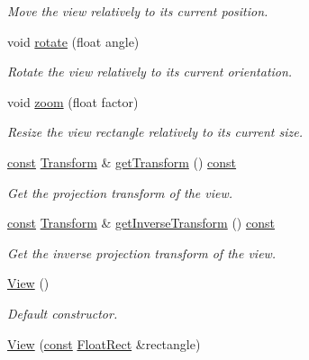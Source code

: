 \begin{DoxyCompactItemize}
\begin{DoxyCompactList}\small\item\em Move the view relatively to its current position. \end{DoxyCompactList}\item 
void \hyperlink{classsf_1_1_view_a5fd3901aae1845586ca40add94faa378}{rotate} (float angle)
\begin{DoxyCompactList}\small\item\em Rotate the view relatively to its current orientation. \end{DoxyCompactList}\item 
void \hyperlink{classsf_1_1_view_a4a72a360a5792fbe4e99cd6feaf7726e}{zoom} (float factor)
\begin{DoxyCompactList}\small\item\em Resize the view rectangle relatively to its current size. \end{DoxyCompactList}\item 
\hyperlink{term__entry_8h_a57bd63ce7f9a353488880e3de6692d5a}{const} \hyperlink{classsf_1_1_transform}{Transform} \& \hyperlink{classsf_1_1_view_a0109dba48aee769126f670a212b3ed7f}{get\-Transform} () \hyperlink{term__entry_8h_a57bd63ce7f9a353488880e3de6692d5a}{const} 
\begin{DoxyCompactList}\small\item\em Get the projection transform of the view. \end{DoxyCompactList}\item 
\hyperlink{term__entry_8h_a57bd63ce7f9a353488880e3de6692d5a}{const} \hyperlink{classsf_1_1_transform}{Transform} \& \hyperlink{classsf_1_1_view_ae7643324b2d8807cf0d9efe9dadfc8cc}{get\-Inverse\-Transform} () \hyperlink{term__entry_8h_a57bd63ce7f9a353488880e3de6692d5a}{const} 
\begin{DoxyCompactList}\small\item\em Get the inverse projection transform of the view. \end{DoxyCompactList}\item 
\hyperlink{classsf_1_1_view_a28c38308ff089ae5bdacd001d12286d3}{View} ()
\begin{DoxyCompactList}\small\item\em Default constructor. \end{DoxyCompactList}\item 
\hyperlink{classsf_1_1_view_a1d63bc49e041b3b1ff992bb6430e1326}{View} (\hyperlink{term__entry_8h_a57bd63ce7f9a353488880e3de6692d5a}{const} \hyperlink{namespacesf_ab0d978f5903922a6bdfca1736b71ccc9}{Float\-Rect} \&rectangle)

\end{DoxyCompactItemize}
